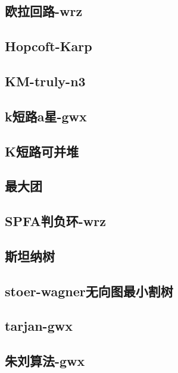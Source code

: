 \documentclass[titlepage,a4paper,10pt]{article}
\begin{document}
\begin{multicols}{2}
\begin{spacing}{0.8}
			\subsection{欧拉回路-wrz}
				
			\subsection{Hopcoft-Karp}
				
			\subsection{KM-truly-n3}
				
			\subsection{k短路a星-gwx}
				
			\subsection{K短路可并堆}
				
			\subsection{最大团}
				
			\subsection{SPFA判负环-wrz}
				
			\subsection{斯坦纳树}
				
			\subsection{stoer-wagner无向图最小割树}
				
			\subsection{tarjan-gwx}
				
			\subsection{朱刘算法-gwx}
				

\end{spacing}
\end{multicols}
\end{document}
